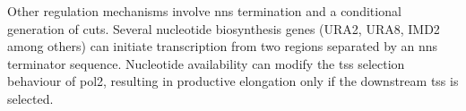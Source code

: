 Other regulation mechanisms involve \gls{nns} termination and a conditional generation of cuts.
Several nucleotide biosynthesis genes (URA2, URA8, IMD2 among others) can initiate transcription from two regions separated by an \gls{nns} terminator sequence.
Nucleotide availability can modify the \gls{tss} selection behaviour of \gls{pol2}, resulting in productive elongation only if the downstream \gls{tss} is selected.



\clearpage



